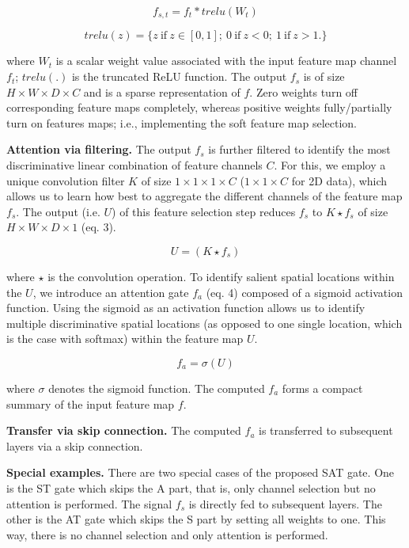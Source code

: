 \documentclass{article}
\begin{document}
\begin{equation}
f_{s,t} = f_{t}\ast trelu (W_t)
\end{equation}

\begin{equation}
trelu(z) = \{z \ \textrm{if} \ z\in [0,1]; \ 0 \ \textrm{if} \ z<0; \ 1 \ \textrm{if} \ z>1. \}
\end{equation}

\noindent where $W_t$ is a scalar weight value associated with the input feature map channel $f_t$; $trelu(.)$ is the truncated ReLU function. The output $f_s$ is of size $H\times W\times D\times C$ and is a sparse representation of $f$. Zero weights turn off corresponding feature maps completely, whereas positive weights fully/partially turn on features maps; i.e., implementing the soft feature map selection.

\noindent \textbf{Attention via filtering.} The output $f_s$ is further filtered to identify the most discriminative linear combination of feature channels $C$. For this, we employ a unique convolution filter $K$ of size $1\times 1\times 1\times C$ ($1\times 1\times C$ for 2D data), which allows us to learn how best to aggregate the different channels of the feature map $f_s$. The output (i.e. $U$) of this feature selection step reduces $f_s$ to $K\star f_s$ of size $H\times W\times D\times 1$ (eq. 3).

\begin{equation}
U=(K\star f_s)
\end{equation}


\noindent where $\star$ is the convolution operation. To identify salient spatial locations within the $U$, we introduce an attention gate $f_a$ (eq. 4) composed of a sigmoid activation function. Using the sigmoid as an activation function allows us to identify multiple discriminative spatial locations (as opposed to one single location, which is the case with softmax) within the feature map $U$.

\begin{equation}
f_a= \sigma(U)
\end{equation}

\noindent where $\sigma$ denotes the sigmoid function. The computed $f_a$ forms a compact summary of the input feature map $f$.

\noindent \textbf{Transfer via skip connection.} The computed $f_a$ is transferred to subsequent layers via a skip connection.

\noindent \textbf{Special examples.} There are two special cases of the proposed SAT gate. One is the ST gate which skips the A part, that is, only channel selection but no attention is performed. The signal $f_s$ is directly fed to subsequent layers. The other is the AT gate which skips the S part by setting all weights to one. This way, there is no channel selection and only attention is performed.
\end{document}
